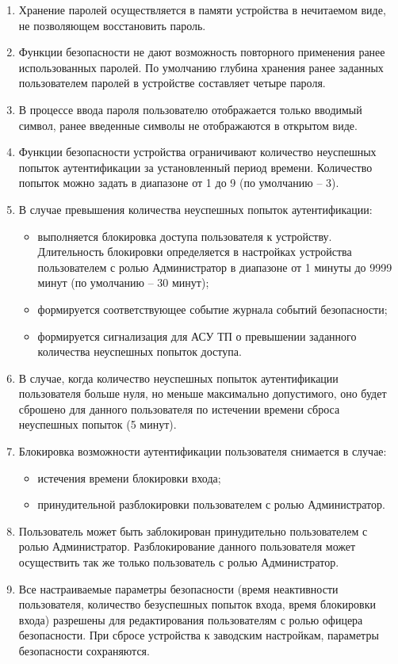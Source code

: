 \begin{enumerate}[label=\arabic{section}.\arabic{subsection}.\arabic*, labelsep=7pt, leftmargin=0pt, itemindent=60pt, align=left]
\begin{enumerate}
\begin{itemize}
\end{itemize}
\item Хранение паролей осуществляется в памяти устройства в нечитаемом виде, не позволяющем восстановить пароль.
\item Функции безопасности не дают возможность повторного применения ранее использованных паролей.
По умолчанию глубина хранения ранее заданных пользователем паролей в устройстве составляет четыре пароля.
\item В процессе ввода пароля пользователю отображается только вводимый символ, ранее введенные символы не отображаются в открытом виде.
\item Функции безопасности устройства ограничивают количество неуспешных попыток аутентификации за установленный период времени.
Количество попыток можно задать в диапазоне от 1 до 9 (по умолчанию – 3).
\item В случае превышения количества неуспешных попыток аутентификации:
\begin{itemize}
  \item выполняется блокировка доступа пользователя к устройству. Длительность блокировки определяется в настройках устройства пользователем с ролью Администратор в диапазоне от 1 минуты до 9999 минут (по умолчанию – 30 минут);
  \item формируется соответствующее событие журнала событий безопасности;
  \item формируется сигнализация для АСУ ТП о превышении заданного количества неуспешных попыток доступа.
\end{itemize}
\item В случае, когда количество неуспешных попыток аутентификации пользователя больше нуля, но меньше максимально допустимого, оно будет сброшено для данного пользователя по истечении времени сброса неуспешных попыток (5 минут).
\item Блокировка возможности аутентификации пользователя снимается в случае:
\begin{itemize}
  \item истечения времени блокировки входа;
  \item принудительной разблокировки пользователем с ролью Администратор.
\end{itemize}
\item Пользователь может быть заблокирован принудительно пользователем с ролью Администратор. Разблокирование данного пользователя может осуществить так же только пользователь с ролью Администратор.
\item Все настраиваемые параметры безопасности (время неактивности пользователя, количество безуспешных попыток входа, время блокировки входа) разрешены для редактирования пользователям с ролью офицера безопасности. При сбросе устройства к заводским настройкам, параметры безопасности сохраняются.


\end{enumerate}
\end{enumerate}
